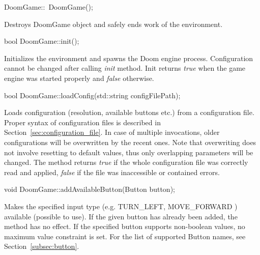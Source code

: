 \vspace{20pt}
\begin{clinee}
DoomGame::~DoomGame();
\end{clinee}
	Destroys DoomGame object and safely ends work of the environment.


\vspace{20pt}
\begin{clinee}
bool DoomGame::init();
\end{clinee}

	Initializes the environment and spawns the Doom engine process. Configuration cannot be changed after calling \emph{init} method. Init returns \emph{true} when the game engine was started properly and \emph{false} otherwise. 


\vspace{20pt}
\begin{clinee}
bool DoomGame::loadConfig(std::string configFilePath);
\end{clinee}

	Loads configuration (resolution, available buttons etc.) from a configuration file. Proper syntax of configuration files is described in Section~\ref{sec:configuration_file}. In case of multiple invocations, older configurations will be overwritten by the recent ones. Note that overwriting does not involve resetting to default values, thus only overlapping parameters will be changed. The method returns \emph{true} if the whole configuration file was correctly read and applied, \emph{false} if the file was inaccessible or contained errors.


\vspace{20pt}
\begin{clinee}
void DoomGame::addAvailableButton(Button button);
\end{clinee}

	Makes the specified input type (e.g. TURN\_LEFT, MOVE\_FORWARD ) available (possible to use). If the given button has already been added, the method has no effect. If the specified button supports non-boolean values, no maximum value constraint is set. For the list of supported Button names, see Section~\ref{subsec:button}.


